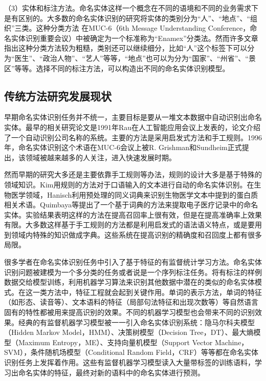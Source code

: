 \documentclass[winfonts,master,oneside,nobackinfo]{njuthesis}
\begin{document}
（3）实体和标注方法。命名实体这样一个概念在不同的语境和不同的业务需求下是有区别的。大多数的命名实体识别的研究将实体的类别分为“人”、“地点”、“组织”三类。这种分类方法 在MUC-6（6th Message Understanding Conference，命名实体识别重要会议）中被确定为一个标准称为“Enamex”分类法。然而许多文章指出这种分类方法较为粗糙，类别还可以继续细分，比如“人”这个标签下可以分为“医生”、“政治人物”、“艺人”等等，“地点”也可以为分为“国家”、“州省”、“景区”等等。选择不同的标注方法，可以构造出不同的命名实体识别模型。

\subsection{传统方法研究发展现状}
早期命名实体识别任务并不统一，主要目标是要从一堆文本数据中自动识别出命名实体。最早的相关研究论文是1991年Rau\cite{Rau}在人工智能应用会议上发表的，论文介绍了一个自动识别公司名称的系统。主要的方法是采用启发式方法和手工规则。1996年，命名实体识别这个术语在MUC-6会议上被R. Grishman和Sundheim正式提出，该领域被越来越多的人关注，进入快速发展时期。

然而早期的研究大多还是主要依靠手工规则等办法，规则的设计大多是基于特殊的领域知识。Kim\cite{Kim}用规则的方法对于口语输入的文本进行自动的命名实体识别。在生物医学领域，Hanisch\cite{Hanisch}利用预处理的同义词典来识别生物医学文本中提到的蛋白质相关术语。Quimbaya\cite{Quimbaya}等提出了一个基于词典的方法来提取电子医疗记录中的命名实体。实验结果表明这样的方法在提高召回率上很有效，但是在提高准确率上效果有限。大多数这样基于手工规则的方法都是利用启发式的语法语义特点，或是要用到领域内特殊的知识做成字典。这些系统在提高识别的精确度和召回度上都有很多局限。

很多学者在命名实体识别任务中引入了基于特征的有监督统计学习方法。命名实体识别问题被建模为一个多分类的任务或者说是一个序列标注任务。将有标注的样例数据交给模型训练，利用机器学习算法来识别其他数据中潜在的类似的命名实体模式。在这一类方法中，特征工程就会起到关键作用。单词的表示方法\cite{Nadeau}，单词的特征（如形态、读音等）\cite{Settles}、文本语料的特征（局部句法特征和出现次数等）\cite{Ravin}等自然语言固有的特性都被用来提高识别的效果。不同的机器学习模型也会带来不同的识别效果。经典的有监督机器学习模型被一一引入命名实体识别系统：隐马尔科夫模型（Hidden Markov Model，HMM）\cite{Eddy}、决策树模型（Decision Tree，DT）\cite{Quinlan}、最大熵模型（Maximum Entropy，ME）\cite{Kapur}、支持向量机模型（Support Vector Machine，SVM）\cite{Hearst}，条件随机场模型（Conditional Random Field，CRF）\cite{Lafferty}等等都在命名实体识别任务上发挥着作用。这些有监督机器学习模型读入大量带标签的训练语料，学习出命名实体的特征，最终对新的语料中的命名实体进行预测。
\end{document}
